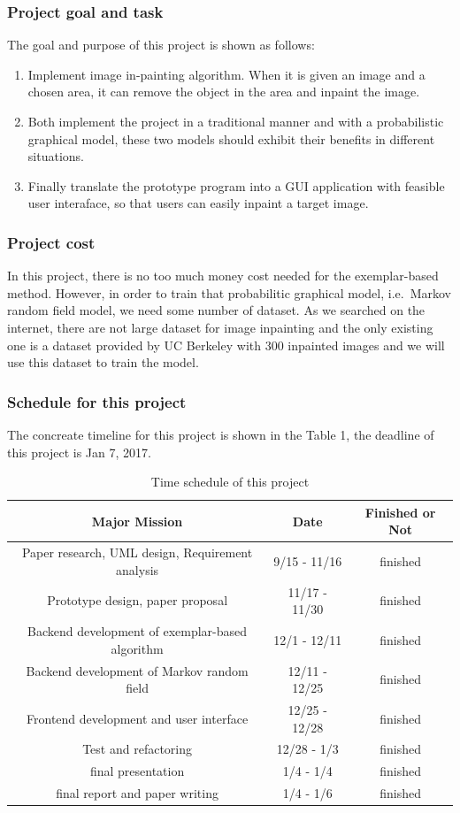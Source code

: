 \subsubsection{Project goal and task}
The goal and purpose of this project is shown as follows:
\begin{enumerate}
	\item Implement image in-painting algorithm. 
        When it is given an image and a chosen area, 
        it can remove the object in the area and inpaint the image.
    \item Both implement the project in a traditional manner and
        with a probabilistic graphical model, these two models should
        exhibit their benefits in different situations.
    \item Finally translate the prototype program into a GUI application
        with feasible user interaface, so that users can easily inpaint
        a target image.
\end{enumerate}
\subsubsection{Project cost}
In this project, there is no too much money cost needed for the 
exemplar-based method. However, in order to train that probabilitic
graphical model, i.e.\ Markov random field model, we need some number
of dataset. As we searched on the internet, there are not large dataset
for image inpainting and the only existing one is a dataset provided by
UC Berkeley with 300 inpainted images and we will use this dataset to
train the model.
\subsubsection{Schedule for this project}
The concreate timeline for this project is shown in the Table 1,
the deadline of this project is Jan 7, 2017.
\begin{table}
\hspace{-1cm}
\begin{tabular}{|c|c|c|}
\hline
Major Mission & Date & Finished or Not \\
\hline
Paper research, UML design, Requirement analysis
& 9/15 - 11/16& finished \\
\hline
Prototype design, paper proposal & 11/17 - 11/30 & finished \\
\hline
Backend development of exemplar-based algorithm & 12/1 - 12/11 & finished\\
\hline
Backend development of Markov random field & 12/11 - 12/25 & finished\\
\hline
Frontend development and user interface & 12/25 - 12/28 & finished\\
\hline
Test and refactoring & 12/28 - 1/3 &finished\\
\hline 
    final presentation & 1/4 - 1/4 & finished \\ \hline
    final report and paper writing & 1/4 - 1/6 & finished \\ \hline
\end{tabular}
\caption{Time schedule of this project}
\end{table}
